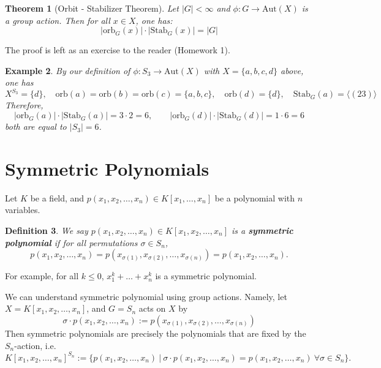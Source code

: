 \documentclass[11pt]{book}
\newtheorem{theorem}{Theorem}[section]
\newtheorem{definition}[theorem]{Definition}
\newtheorem{example}[theorem]{Example}
\begin{document}
\begin{theorem}[Orbit - Stabilizer Theorem]\label{thm-orbitStablizer}
Let $|G| < \infty$ and $\phi : G \to \mathrm{Aut}(X)$ is a group action. Then for all $x \in X$, one has:
\[
|\mathrm{orb}_G(x)| \cdot |\mathrm{Stab}_G(x)| = |G|
\]
\end{theorem}
The proof is left as an exercise to the reader (Homework 1).

\begin{example}
    By our definition of $\phi: S_3 \to \mathrm{Aut}(X)$ with $X = \{a,b,c,d\}$ above, one has
    $$X^{S_3} = \{d\}, \quad \mathrm{orb}(a) = \mathrm{orb}(b) = \mathrm{orb}(c) = \{a,b,c\},  \quad \mathrm{orb}(d) = \{d\},\quad \mathrm{Stab}_G(a) = \langle (23) \rangle$$
    Therefore,
    $$|\mathrm{orb}_G(a)| \cdot |\mathrm{Stab}_G(a)| = 3 \cdot 2 = 6, \quad \quad |\mathrm{orb}_G(d)| \cdot |\mathrm{Stab}_G(d)| = 1 \cdot 6 = 6$$
    both are equal to $|S_3| = 6$.
\end{example}


\section{Symmetric Polynomials} \label{sec-symm}
Let $K$ be a field, and $p(x_1, x_2, \dots, x_n) \in K[x_1, \dots, x_n]$ be a polynomial with $n$ variables.
\begin{definition}
    We say $p(x_1, x_2, \dots, x_n) \in K[x_1, x_2, \dots, x_n]$ is a {\bf symmetric polynomial} if for all permutations $\sigma \in S_n$, 
    $$p(x_1, x_2, \dots, x_n) = p(x_{\sigma(1)}, x_{\sigma(2)}, \dots, x_{\sigma(n)}) = p(x_1, x_2, \dots, x_n).$$
\end{definition}
For example, for all $k \leq 0$, $x_1^k + \dots 
+ x_n
^k$ is a symmetric polynomial.

We can understand symmetric polynomial using group actions. Namely, let $X = K[x_1, x_2, \dots, x_n]$, and $G = S_n$ acts on $X$ by
$$\sigma \cdot p(x_1, x_2, \dots, x_n) := p(x_{\sigma(1)}, x_{\sigma(2)}, \dots, x_{\sigma(n)})$$
Then symmetric polynomials are precisely the polynomials that are fixed by the $S_n$-action, i.e.
$$K[x_1, x_2, \dots, x_n]^{S_n} := \{ p(x_1, x_2, \dots, x_n)\ |\ \sigma \cdot p(x_1, x_2, \dots, x_n) = p(x_1, x_2, \dots, x_n)\ \forall \sigma \in S_n\} .$$
\end{document}
